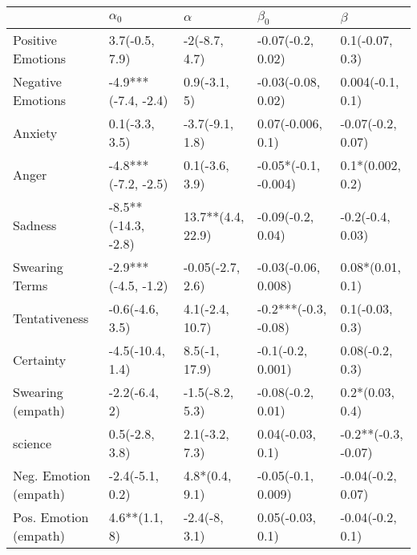 \begin{tabular}{lllll}
\toprule
{} &           $\alpha_0$ &           $\alpha$ &             $\beta_0$ &              $\beta$ \\
\midrule
Positive Emotions     &       3.7(-0.5, 7.9) &      -2(-8.7, 4.7) &     -0.07(-0.2, 0.02) &      0.1(-0.07, 0.3) \\
Negative Emotions     &  -4.9***(-7.4, -2.4) &       0.9(-3.1, 5) &    -0.03(-0.08, 0.02) &     0.004(-0.1, 0.1) \\
Anxiety               &       0.1(-3.3, 3.5) &    -3.7(-9.1, 1.8) &     0.07(-0.006, 0.1) &    -0.07(-0.2, 0.07) \\
Anger                 &  -4.8***(-7.2, -2.5) &     0.1(-3.6, 3.9) &  -0.05*(-0.1, -0.004) &     0.1*(0.002, 0.2) \\
Sadness               &  -8.5**(-14.3, -2.8) &  13.7**(4.4, 22.9) &     -0.09(-0.2, 0.04) &     -0.2(-0.4, 0.03) \\
Swearing Terms        &  -2.9***(-4.5, -1.2) &   -0.05(-2.7, 2.6) &   -0.03(-0.06, 0.008) &     0.08*(0.01, 0.1) \\
Tentativeness         &      -0.6(-4.6, 3.5) &    4.1(-2.4, 10.7) &  -0.2***(-0.3, -0.08) &      0.1(-0.03, 0.3) \\
Certainty             &     -4.5(-10.4, 1.4) &      8.5(-1, 17.9) &     -0.1(-0.2, 0.001) &      0.08(-0.2, 0.3) \\
Swearing (empath)     &        -2.2(-6.4, 2) &    -1.5(-8.2, 5.3) &     -0.08(-0.2, 0.01) &      0.2*(0.03, 0.4) \\
science               &       0.5(-2.8, 3.8) &     2.1(-3.2, 7.3) &      0.04(-0.03, 0.1) &  -0.2**(-0.3, -0.07) \\
Neg. Emotion (empath) &      -2.4(-5.1, 0.2) &     4.8*(0.4, 9.1) &    -0.05(-0.1, 0.009) &    -0.04(-0.2, 0.07) \\
Pos. Emotion (empath) &        4.6**(1.1, 8) &      -2.4(-8, 3.1) &      0.05(-0.03, 0.1) &     -0.04(-0.2, 0.1) \\
\bottomrule
\end{tabular}
